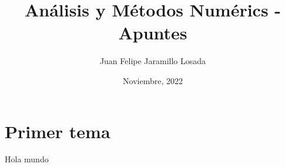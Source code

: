 \documentclass{article}
\title{Análisis y Métodos Numérics - Apuntes}
\author{Juan Felipe Jaramillo Losada}
\date{Noviembre, 2022}
\begin{document}
\maketitle

\section*{Primer tema}
Hola mundo
\end{document}

